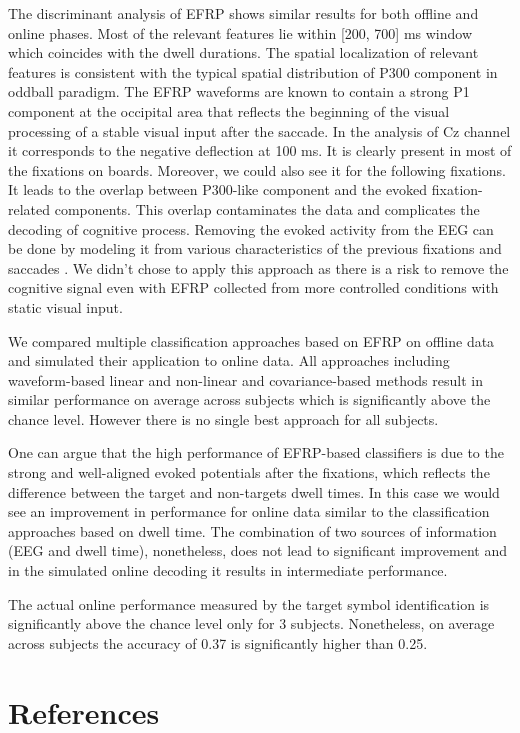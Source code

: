 \documentclass[12pt]{iopart}
\begin{document}
The discriminant analysis of EFRP shows similar results for both
offline and online phases. Most of the relevant
features lie within [200, 700] ms window which coincides with the dwell
durations. The spatial localization of relevant features is consistent with the typical
spatial distribution of P300 component in oddball paradigm.
The EFRP waveforms are known to contain a strong P1 component at the occipital
area that reflects the beginning of the visual processing of a stable visual input
after the saccade. In the analysis of Cz channel it corresponds to the negative
deflection at 100 ms. It is clearly present in most of the fixations on boards.
Moreover, we could also see it for the following fixations.
It leads to the overlap between P300-like component and 
the evoked fixation-related components. This overlap contaminates the
data and complicates the decoding of cognitive process.
Removing the evoked activity from the EEG can be done
by modeling it from various characteristics of the previous fixations and saccades \cite{nikolaev_combining_2016}.
We didn't chose to apply this approach as there is a risk 
to remove the cognitive signal even with EFRP collected
from more controlled conditions with static visual input.


We compared multiple classification approaches based on EFRP on offline data and 
simulated their application to online data.
All approaches including waveform-based linear and non-linear and covariance-based 
methods result in similar performance on average across subjects
which is significantly above the chance level.
However there is no single best approach for all subjects.

One can argue that the high performance of EFRP-based classifiers is
due to the strong and well-aligned evoked potentials after the fixations,
which reflects the difference between the target and non-targets dwell times.
In this case we would see an improvement in performance for online data
similar to the classification approaches based on dwell time.
The combination of two sources of information (EEG and dwell time), nonetheless,
does not lead to significant improvement and in the simulated online
decoding it results in intermediate performance.

The actual online performance measured by the target symbol identification
is significantly above the chance level only for 3 subjects.
Nonetheless, on average across subjects the accuracy of 0.37 is 
significantly higher than 0.25.



\section*{References}



\end{document}
